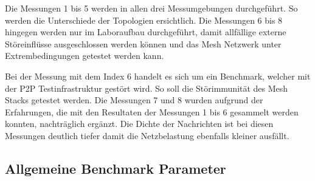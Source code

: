 \begin{table}[h]
\centering
{}
\caption{Bedeutung Benchmark Parameter}
\label{tab:BedeutungBenchmarkParameter}
\end{table}

Die Messungen 1 bis 5 werden in allen drei Messumgebungen durchgeführt.
So werden die Unterschiede der Topologien ersichtlich.
Die Messungen 6 bis 8 hingegen werden nur im Laboraufbau durchgeführt,  damit allfällige externe Störeinflüsse ausgeschlossen werden können und das Mesh Netzwerk unter Extrembedingungen getestet werden kann.

Bei der Messung mit dem Index 6 handelt es sich um ein Benchmark, welcher mit der P2P Testinfrastruktur gestört wird. So soll die Störimmunität des Mesh Stacks getestet werden.
Die Messungen 7 und 8 wurden aufgrund der Erfahrungen, die mit den Resultaten der Messungen 1 bis 6 gesammelt werden konnten, nachträglich ergänzt.
Die Dichte der Nachrichten ist bei diesen Messungen deutlich tiefer damit die Netzbelastung ebenfalls kleiner ausfällt.


\subsection{Allgemeine Benchmark Parameter}\label{subsec:AllgemeineBenchmarkParameter}

